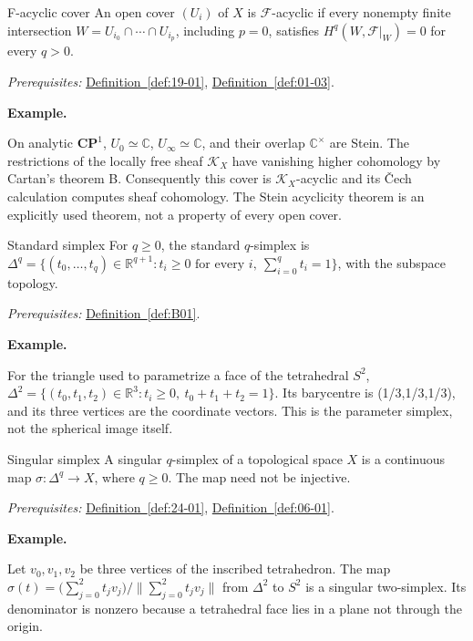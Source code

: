 \documentclass[11pt]{article}
\makeatletter
\newcommand{\R}{\mathbb R}
\newcommand{\C}{\mathbb C}
\newcounter{definition}
\newcommand{\CP}{\mathbf{CP}}
\newcommand{\exampleheading}{\par\medskip\textbf{Example.}\par\smallskip}
\newcommand{\currentdefinition}[1]{\protected@edef\@currentlabel{#1}}
\makeatother
\begin{document}
\begin{definitionbox}{F-acyclic cover}
\currentdefinition{\thedefinition}
\label{def:22-01}
An open cover $(U_i)$ of $X$ is $\mathcal F$-acyclic if every nonempty finite intersection $W=U_{i_0}\cap\cdots\cap U_{i_p}$, including $p=0$, satisfies $H^q(W,\mathcal F|_W)=0$ for every $q>0$.

\smallskip
\textit{Prerequisites:} \hyperref[def:19-01]{Definition~\ref*{def:19-01}}, \hyperref[def:01-03]{Definition~\ref*{def:01-03}}.

\exampleheading
On analytic $\CP^1$, $U_0\simeq\C$, $U_\infty\simeq\C$, and their overlap $\C^\times$ are Stein. The restrictions of the locally free sheaf $\mathcal K_X$ have vanishing higher cohomology by Cartan's theorem B. Consequently this cover is $\mathcal K_X$-acyclic and its \v{C}ech calculation computes sheaf cohomology. The Stein acyclicity theorem is an explicitly used theorem, not a property of every open cover.
\end{definitionbox}

\begin{definitionbox}{Standard simplex}
\currentdefinition{\thedefinition}
\label{def:24-01}
For $q\ge0$, the standard $q$-simplex is $\Delta^q=\{(t_0,\ldots,t_q)\in\R^{q+1}:t_i\ge0\text{ for every }i,\ \sum_{i=0}^q t_i=1\}$, with the subspace topology.

\smallskip
\textit{Prerequisites:} \hyperref[def:B01]{Definition~\ref*{def:B01}}.

\exampleheading
For the triangle used to parametrize a face of the tetrahedral $S^2$, $\Delta^2=\{(t_0,t_1,t_2)\in\R^3:t_i\ge0,\ t_0+t_1+t_2=1\}$. Its barycentre is (1/3,1/3,1/3), and its three vertices are the coordinate vectors. This is the parameter simplex, not the spherical image itself.
\end{definitionbox}

\begin{definitionbox}{Singular simplex}
\currentdefinition{\thedefinition}
\label{def:24-02}
A singular $q$-simplex of a topological space $X$ is a continuous map $\sigma:\Delta^q\to X$, where $q\ge0$. The map need not be injective.

\smallskip
\textit{Prerequisites:} \hyperref[def:24-01]{Definition~\ref*{def:24-01}}, \hyperref[def:06-01]{Definition~\ref*{def:06-01}}.

\exampleheading
Let $v_0,v_1,v_2$ be three vertices of the inscribed tetrahedron. The map $\sigma(t)=\bigl(\sum_{j=0}^2t_jv_j\bigr)/\|\sum_{j=0}^2t_jv_j\|$ from $\Delta^2$ to $S^2$ is a singular two-simplex. Its denominator is nonzero because a tetrahedral face lies in a plane not through the origin.
\end{definitionbox}
\end{document}
